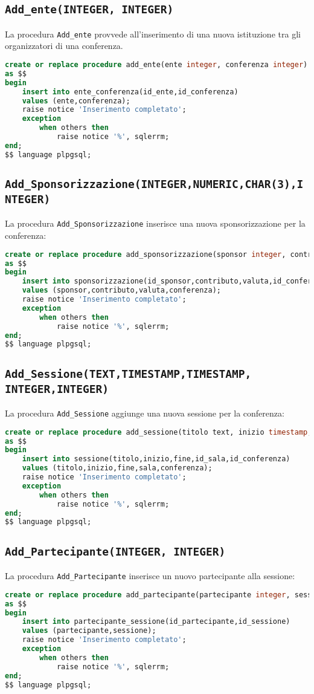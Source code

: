 \subsection{\texttt{Add\_ente(INTEGER, INTEGER)}}
La procedura \texttt{Add\_ente} provvede all'inserimento di una nuova istituzione tra gli organizzatori di una conferenza.
\begin{lstlisting}[language=SQL,style=mystyle]
create or replace procedure add_ente(ente integer, conferenza integer)
as $$
begin
    insert into ente_conferenza(id_ente,id_conferenza)
    values (ente,conferenza);
    raise notice 'Inserimento completato';
    exception
        when others then
            raise notice '%', sqlerrm;
end;
$$ language plpgsql;
\end{lstlisting}
\subsection{\texttt{Add\_Sponsorizzazione(INTEGER,NUMERIC,CHAR(3),INTEGER)}}
La procedura \texttt{Add\_Sponsorizzazione} inserisce una nuova sponsorizzazione per la conferenza:
\begin{lstlisting}[language=SQL, style=mystyle]
create or replace procedure add_sponsorizzazione(sponsor integer, contributo numeric(1000,2), valuta char(3), conferenza integer)
as $$
begin
    insert into sponsorizzazione(id_sponsor,contributo,valuta,id_conferenza)
    values (sponsor,contributo,valuta,conferenza);
    raise notice 'Inserimento completato';
    exception
        when others then
            raise notice '%', sqlerrm;
end;
$$ language plpgsql;
\end{lstlisting}
\subsection{\texttt{Add\_Sessione(TEXT,TIMESTAMP,TIMESTAMP, INTEGER,INTEGER)}}
La procedura \texttt{Add\_Sessione} aggiunge una nuova sessione per la conferenza:
\begin{lstlisting}[language=SQL, style=mystyle]
create or replace procedure add_sessione(titolo text, inizio timestamp, fine timestamp, sala integer, conferenza integer)
as $$
begin
    insert into sessione(titolo,inizio,fine,id_sala,id_conferenza)
    values (titolo,inizio,fine,sala,conferenza);
    raise notice 'Inserimento completato';
    exception
        when others then
            raise notice '%', sqlerrm;
end;
$$ language plpgsql;
\end{lstlisting}
\subsection{\texttt{Add\_Partecipante(INTEGER, INTEGER)}}
La procedura \texttt{Add\_Partecipante} inserisce un nuovo partecipante alla sessione:
\begin{lstlisting}[language=SQL, style=mystyle]
create or replace procedure add_partecipante(partecipante integer, sessione integer)
as $$
begin
    insert into partecipante_sessione(id_partecipante,id_sessione)
    values (partecipante,sessione);
    raise notice 'Inserimento completato';
    exception
        when others then
            raise notice '%', sqlerrm;
end;
$$ language plpgsql;
\end{lstlisting}
